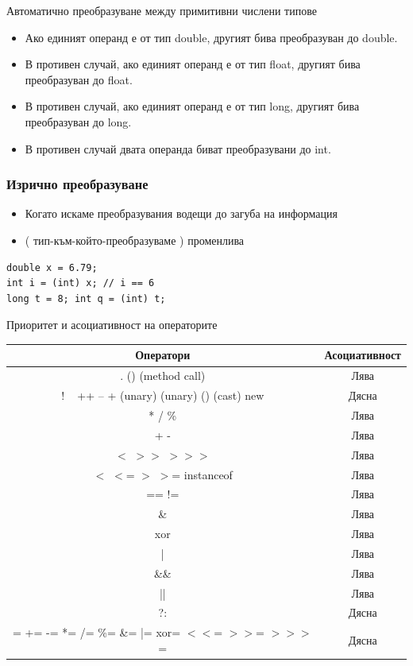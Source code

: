 \documentclass{beamer}
\begin{document}
\begin{frame}{Автоматично преобразуване между примитивни числени типове}
  \transdissolve
  \begin{itemize}
    \item Ако единият операнд е от тип double, другият бива
      преобразуван до double. \pause
    \item В противен случай, ако единият операнд е от тип float,
      другият бива преобразуван до float. \pause
    \item В противен случай, ако единият операнд е от тип long,
      другият бива преобразуван до long. \pause
    \item В противен случай двата операнда биват преобразувани до
      int. \pause
  \end{itemize}
\end{frame}

\begin{frame}[fragile]
  \frametitle{Изрично преобразуване}
  \transdissolve
  \begin{itemize}
  \item Когато искаме преобразувания водещи
    до загуба на информация \pause
  \item ( тип-към-който-преобразуваме ) променлива
  \end{itemize}
  \begin{lstlisting}
double x = 6.79;
int i = (int) x; // i == 6
long t = 8; int q = (int) t;
  \end{lstlisting}
\end{frame}

\begin{frame}{Приоритет и асоциативност на операторите}
  \transdissolve
\small
\begin{tabular}{|c|c|}
  \hline
  Оператори & Асоциативност \\
  \hline
  [] . () (method call) & Лява \\
  \hline
  ! ~ ++ -- + (unary) (unary) () (cast) new & Дясна \\
  \hline
  * / \% & Лява \\
  \hline
  + -   & Лява \\
  \hline
  $<$ $>$$>$ $>$$>$$>$ & Лява \\
  \hline
  $<$ $<$= $>$ $>$= instanceof & Лява \\
  \hline
  == != & Лява \\
  \hline
  \& & Лява \\
  \hline
  xor & Лява \\
  \hline
  |                                      & Лява \\
  \hline
  \&\&                                   &  Лява \\
  \hline
  ||                                   &  Лява \\
  \hline
  ?:                                  &   Дясна \\
  \hline
  = += -= *= /= \%= \&= |= xor= $<$$<$= $>$$>$= $>$$>$$>$= & Дясна \\
  \hline
\end{tabular}

\end{frame}
\end{document}
